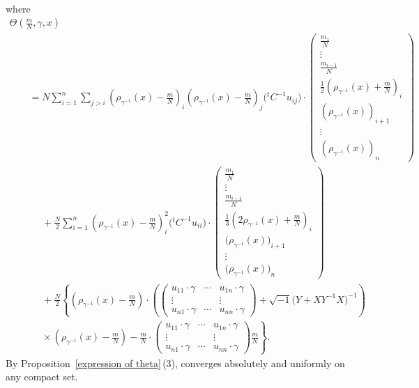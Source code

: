 \documentclass[10pt,a4paper]{amsart}
\numberwithin{equation}{section}
\begin{document}
\begin{Example}
\begin{align*}
\end{align*}
where
\begin{gather*}
\Theta \left(\frac{m}{N}, \gamma, x\right)
\\
\qquad=N\sum_{i=1}^n\sum_{j>i}\left( \rho_{\gamma^{-1}}(x)-\frac{m}{N}\right)_i \left( \rho_{\gamma^{-1}}(x)-\frac{m}{N}\right)_j\bigl( {}^tC^{-1}u_{ij}\bigr)\cdot
\begin{pmatrix}
\frac{m_1}{N} \\
\vdots \\
\frac{m_{i-1}}{N} \\
\frac{1}{2}\left( \rho_{\gamma^{-1}}(x)+\frac{m}{N}\right)_i \\
\left( \rho_{\gamma^{-1}}(x)\right)_{i+1} \\
\vdots \\
\left( \rho_{\gamma^{-1}}(x)\right)_n
\end{pmatrix}\\
\phantom{\qquad=}{} +\frac{N}{2}\sum_{i=1}^n\left( \rho_{\gamma^{-1}}(x)-\frac{m}{N}\right)_i^2\bigl( {}^tC^{-1}u_{ii}\bigr)\cdot
\begin{pmatrix}
\frac{m_1}{N} \\
\vdots \\
\frac{m_{i-1}}{N} \\
\frac{1}{3}\left(2\rho_{\gamma^{-1}}(x)+\frac{m}{N}\right)_i \\
\bigl( \rho_{\gamma^{-1}}(x)\bigr)_{i+1} \\
\vdots \\
\bigl( \rho_{\gamma^{-1}}(x)\bigr)_n
\end{pmatrix}\\
\phantom{\qquad=}{} + \frac{N}{2} \left\{\left( \rho_{\gamma^{-1}}(x)-\frac{m}{N}\right) \cdot \left(
\begin{pmatrix}
u_{11}\cdot \gamma & \cdots & u_{1n}\cdot \gamma \\
\vdots & & \vdots \\
u_{n1}\cdot \gamma & \cdots & u_{nn}\cdot \gamma
\end{pmatrix}
+ \sqrt{-1}\bigl(Y+XY^{-1}X\bigr)^{-1} \right)\right.\\
\left.\phantom{\qquad=}{}\times
\left( \rho_{\gamma^{-1}}(x)-\frac{m}{N}\right) - \frac{m}{N}\cdot
\begin{pmatrix}
u_{11}\cdot \gamma & \cdots & u_{1n}\cdot \gamma \\
\vdots & & \vdots \\
u_{n1}\cdot \gamma & \cdots & u_{nn}\cdot \gamma
\end{pmatrix}
\frac{m}{N}\right\}.
\end{gather*}
By Proposition~\ref{expression of theta}\,(3),  converges absolutely and uniformly on any compact set.
\end{Example}
\end{document}
